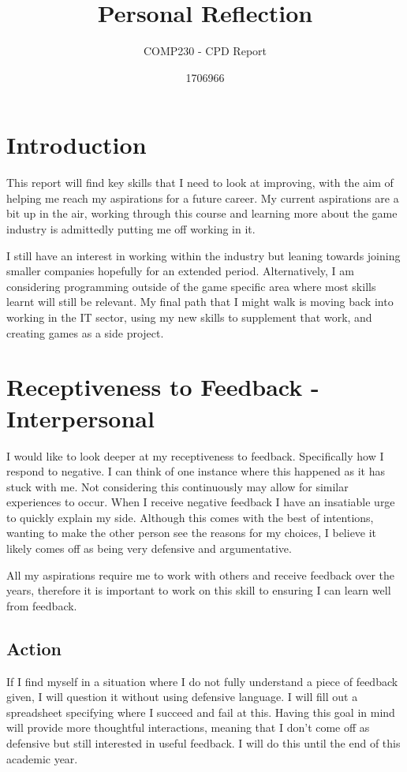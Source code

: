 \documentclass{scrartcl}
\title{Personal Reflection}
\subtitle{COMP230 - CPD Report}
\author{1706966}
\begin{document}
\maketitle

\section{Introduction}
This report will find key skills that I need to look at improving, with the aim of helping me reach my aspirations for a future career. My current aspirations are a bit up in the air, working through this course and learning more about the game industry is admittedly putting me off working in it. 

I still have an interest in working within the industry but leaning towards joining smaller companies hopefully for an extended period. Alternatively, I am considering programming outside of the game specific area where most skills learnt will still be relevant. My final path that I might walk is moving back into working in the IT sector, using my new skills to supplement that work, and creating games as a side project. 

\section{Receptiveness to Feedback - Interpersonal}
I would like to look deeper at my receptiveness to feedback. Specifically how I respond to negative. I can think of one instance where this happened as it has stuck with me. Not considering this continuously may allow for similar experiences to occur. When I receive negative feedback I have an insatiable urge to quickly explain my side. Although this comes with the best of intentions, wanting to make the other person see the reasons for my choices, I believe it likely comes off as being very defensive and argumentative. 

All my aspirations require me to work with others and receive feedback over the years, therefore it is important to work on this skill to ensuring I can learn well from feedback.
\subsection{Action}
If I find myself in a situation where I do not fully understand a piece of feedback given, I will question it without using defensive language. I will fill out a spreadsheet specifying where I succeed and fail at this. Having this goal in mind will provide more thoughtful interactions, meaning that I don't come off as defensive but still interested in useful feedback. I will do this until the end of this academic year.
\end{document}
